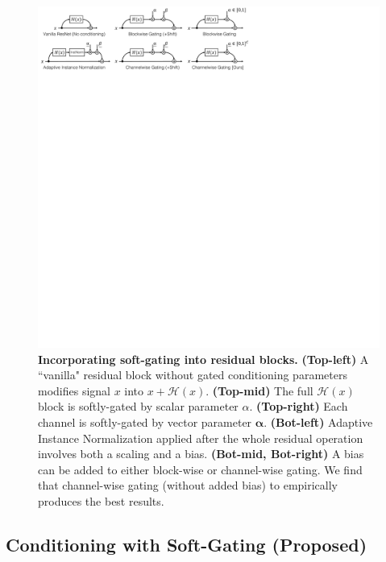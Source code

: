 \begin{figure}[t]
    \centering
    \includegraphics[width=\linewidth]{paper_images/arch_gate.pdf}
    \caption{{\bf Incorporating soft-gating into residual blocks.}  {\bf (Top-left)} A ``vanilla" residual block without gated conditioning parameters modifies signal $x$ into $x+\mathcal{H}(x)$. {\bf (Top-mid)} The full $\mathcal{H}(x)$ block is softly-gated by scalar parameter $\alpha$. {\bf (Top-right)} Each channel is softly-gated by vector parameter $\mathbf{\alpha}$. {\bf (Bot-left)} Adaptive Instance Normalization applied after the whole residual operation involves both a scaling and a bias. {\bf (Bot-mid, Bot-right)} A bias can be added to either block-wise or channel-wise gating. We find that channel-wise gating (without added bias) to empirically produces the best results.\label{fig:arch-gate} }
\end{figure}

\subsection{Conditioning with Soft-Gating (Proposed)}


